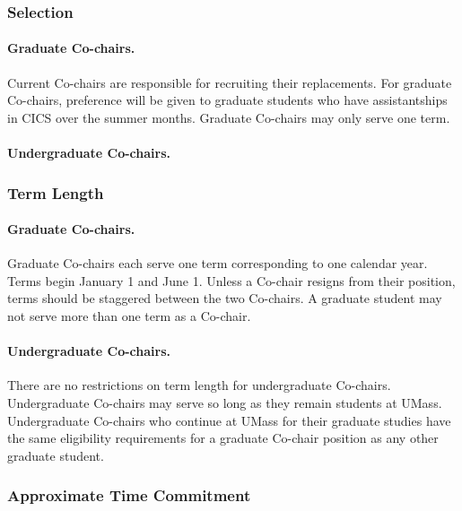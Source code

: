 \subsubsection{Selection}
\label{sec:cochairs_selection}
\paragraph{Graduate Co-chairs.} Current Co-chairs are responsible for recruiting their replacements. For graduate Co-chairs, preference will be given to graduate students who have assistantships in CICS over the summer months. Graduate Co-chairs may only serve one term.

\paragraph{Undergraduate Co-chairs.}

\subsubsection{Term Length}
\label{sec:cochairs_termlength}
\paragraph{Graduate Co-chairs.} Graduate Co-chairs each serve one term corresponding to one calendar year. Terms begin January 1 and June 1. Unless a Co-chair resigns from their position, terms should be staggered between the two Co-chairs. A graduate student may not serve more than one term as a Co-chair. 

\paragraph{Undergraduate Co-chairs.} There are no restrictions on term length for undergraduate Co-chairs. Undergraduate Co-chairs may serve so long as they remain students at UMass. Undergraduate Co-chairs who continue at UMass for their graduate studies have the same eligibility requirements for a graduate Co-chair position as any other graduate student.

\subsubsection{Approximate Time Commitment}

